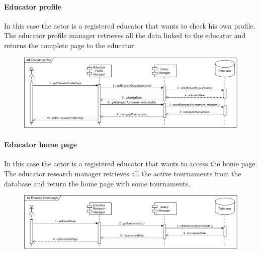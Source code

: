 \documentclass[12pt, a4paper]{report}
\begin{document}
    \paragraph*{Educator profile}
    In this case the actor is a registered educator that wants to check his own profile. 
    The educator profile manager retrieves all the data linked to the educator and returns the complete page to the educator. 
    \begin{figure}[H]
        \centering
        \includegraphics[width=1.0\linewidth]{images/eprv.png}
    \end{figure}

    \paragraph*{Educator home page}
    In this case the actor is a registered educator that wants to access the home page. 
    The educator research manager retrieves all the active tournaments from the database and return the home page with some tournaments. 
    \begin{figure}[H]
        \centering
        \includegraphics[width=1.0\linewidth]{images/ehprv.png}
    \end{figure}
\end{document}
